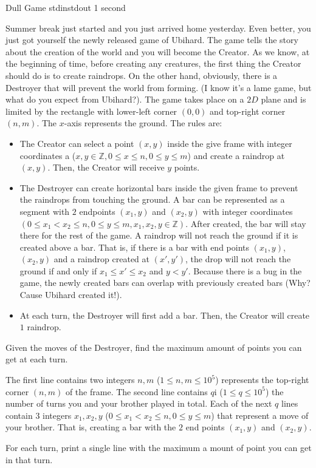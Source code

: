 \begin{problem}{Dull Game}
{stdin}{stdout}
{1 second}{}{}

Summer break just started and you just arrived home yesterday. Even better, you just got yourself the newly released game of Ubihard. The game tells the story about the creation of the world and you will become the Creator. As we know, at the beginning of time, before creating any creatures, the first thing the Creator should do is to create raindrops. On the other hand, obviously, there is a Destroyer that will prevent the world from forming. (I know it's a lame game, but what do you expect from Ubihard?). The game takes place on a $2D$ plane and is limited by the rectangle with lower-left corner $(0, 0)$ and top-right corner $(n, m)$. The $x$-axis represents the ground. The rules are:
	\begin{itemize}
		\item
		The Creator can select a point $(x, y)$ inside the give frame with integer coordinates a ($x, y \in \mathbb{Z}, 0 \leq x \leq n, 0 \leq y \leq m$) and create a raindrop at $(x, y)$. Then, the Creator will receive $y$ points.
		\item
		The Destroyer can create horizontal bars inside the given frame to prevent the raindrops from touching the ground. A bar can be represented as a segment with $2$ endpoints $(x_1, y)$ and $(x_2, y)$ with integer coordinates $(0 \leq x_1 < x_2 \leq n, 0 \leq y \leq m, x_1, x_2, y \in \mathbb{Z})$. After created, the bar will stay there for the rest of the game. A raindrop will not reach the ground if it is created above a bar. That is, if there is a bar with end points $(x_1, y)$, $(x_2, y)$ and a raindrop created at $(x', y')$, the drop will not reach the ground if and only if $x_1 \leq x' \leq x_2$ and $y < y'$. Because there is a bug in the game, the newly created bars can overlap with previously created bars (Why? Cause Ubihard created it!).
		\item
		At each turn, the Destroyer will first add a bar. Then, the Creator will create $1$ raindrop.
	\end{itemize}

\noindent Given the moves of the Destroyer, find the maximum amount of points you can get at each turn.

\InputFile

The first line contains two integers $n, m$ ($1 \leq n, m \leq 10^5$) represents the top-right corner $(n, m)$ of the frame. The second line contains $q$i ($1 \leq q \leq 10^5$) the number of turns you and your brother played in total. Each of the next $q$ lines contain $3$ integers $x_1, x_2, y$ ($0 \leq x_1 < x_2 \leq n, 0 \leq y \leq m$) that represent a move of your brother. That is, creating a bar with the $2$ end points $(x_1, y)$ and $(x_2, y)$.

\OutputFile

For each turn, print a single line with the maximum a mount of point you can get in that turn.

\Examples

\begin{example}
%
\end{example}

\end{problem}
